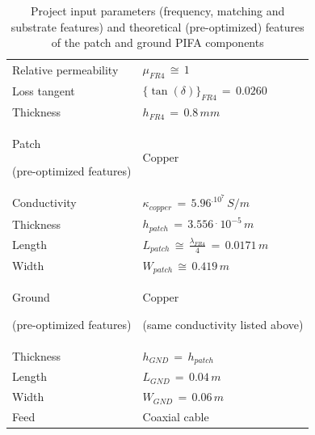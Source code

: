 \documentclass[12pt,a4paper,twocolumn]{article}
\begin{document}
{\begin{table}[b!]
\begin{center}
{\begin{tabular}{||m{4.2cm}|m{4.2cm}||}
				Relative permeability & $\mu_{FR4}\,\cong\,1$\\
				
				Loss tangent & $\{\tan(\delta)\}_{FR4}\,=\,0.0260$\\
				
				Thickness & $h_{FR4}\,=\,0.8\,mm$\\
				\hline
				\cellcolor{pink} Patch
				
				(pre-optimized features) & \cellcolor{pink} Copper \\
				\hline
			Conductivity & $\kappa_{copper}\,=\,5.96^.10^7\,S/m$ \\
			
			Thickness & $h_{patch}\,=\,3.556\,^.\,10^{-5}\,m$\\
			
			Length & $L_{patch}\,\cong\,\frac{\lambda_{FR4}}{4}\,=\,0.0171\,m$\\
			
			Width & $W_{patch}\,\cong\,0.419\,m$\\
			
			\hline
			\cellcolor{pink}Ground 
			
			(pre-optimized features)
			& \cellcolor{pink} Copper
			
			(same conductivity listed above) \\
			\hline
			Thickness & $h_{GND}\,=\,h_{patch}$
			\\
			Length & $L_{GND}\,=\,0.04\,m$\\
			Width & $W_{GND}\,=\,0.06\,m$\\
			\hline
			\cellcolor{pink}Feed & \cellcolor{pink} Coaxial cable \\
			\hline
	\end{tabular}}
	\caption{Project input parameters (frequency, matching and substrate features) and theoretical (pre-optimized) features of the patch and ground PIFA components}
	\label{table:pifa design parameters}
\end{center}

\end{table}

}
\end{document}
